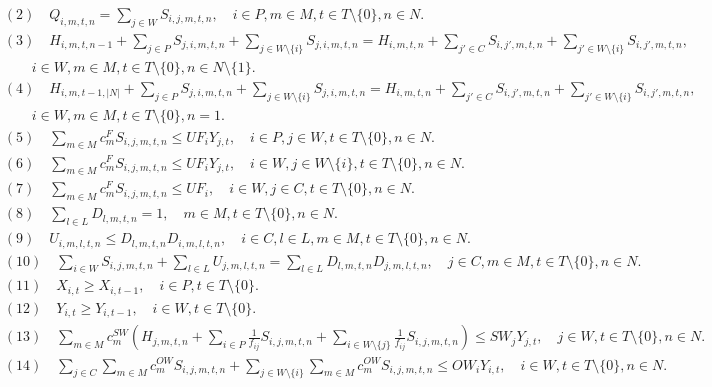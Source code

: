 \documentclass[10pt]{article}
\begin{document}
\[
\begin{aligned}
& (2) \quad Q_{i,m,t,n} = \sum_{j \in W} S_{i,j,m,t,n}, \quad i \in P, m \in M, t \in T \setminus \{0\}, n \in N. \\
& (3) \quad H_{i,m,t,n-1} + \sum_{j \in P} S_{j,i,m,t,n} + \sum_{j \in W \setminus \{i\}} S_{j,i,m,t,n} = H_{i,m,t,n} + \sum_{j' \in C} S_{i,j',m,t,n} + \sum_{j' \in W \setminus \{i\}} S_{i,j',m,t,n}, \\
& \qquad i \in W, m \in M, t \in T \setminus \{0\}, n \in N \setminus \{1\}. \\
& (4) \quad H_{i,m,t-1,|N|} + \sum_{j \in P} S_{j,i,m,t,n} + \sum_{j \in W \setminus \{i\}} S_{j,i,m,t,n} = H_{i,m,t,n} + \sum_{j' \in C} S_{i,j',m,t,n} + \sum_{j' \in W \setminus \{i\}} S_{i,j',m,t,n}, \\
& \qquad i \in W, m \in M, t \in T \setminus \{0\}, n = 1. \\
& (5) \quad \sum_{m \in M} c^F_m S_{i,j,m,t,n} \le UF_i Y_{j,t}, \quad i \in P, j \in W, t \in T \setminus \{0\}, n \in N. \\
& (6) \quad \sum_{m \in M} c^F_m S_{i,j,m,t,n} \le UF_i Y_{j,t}, \quad i \in W, j \in W \setminus \{i\}, t \in T \setminus \{0\}, n \in N. \\
& (7) \quad \sum_{m \in M} c^F_m S_{i,j,m,t,n} \le UF_i, \quad i \in W, j \in C, t \in T \setminus \{0\}, n \in N. \\
& (8) \quad \sum_{l \in L} D_{l,m,t,n} = 1, \quad m \in M, t \in T \setminus \{0\}, n \in N. \\
& (9) \quad U_{i,m,l,t,n} \le D_{l,m,t,n} D_{i,m,l,t,n}, \quad i \in C, l \in L, m \in M, t \in T \setminus \{0\}, n \in N. \\
& (10) \quad \sum_{i \in W} S_{i,j,m,t,n} + \sum_{l \in L} U_{j,m,l,t,n} = \sum_{l \in L} D_{l,m,t,n} D_{j,m,l,t,n}, \quad j \in C, m \in M, t \in T \setminus \{0\}, n \in N. \\
& (11) \quad X_{i,t} \ge X_{i,t-1}, \quad i \in P, t \in T \setminus \{0\}. \\
& (12) \quad Y_{i,t} \ge Y_{i,t-1}, \quad i \in W, t \in T \setminus \{0\}. \\
& (13) \quad \sum_{m \in M} c^{SW}_m \left( H_{j,m,t,n} + \sum_{i \in P} \frac{1}{f_{ij}} S_{i,j,m,t,n} + \sum_{i \in W \setminus \{j\}} \frac{1}{f_{ij}} S_{i,j,m,t,n} \right) \le SW_j Y_{j,t}, \quad j \in W, t \in T \setminus \{0\}, n \in N. \\
& (14) \quad \sum_{j \in C} \sum_{m \in M} c^{OW}_m S_{i,j,m,t,n} + \sum_{j \in W \setminus \{i\}} \sum_{m \in M} c^{OW}_m S_{i,j,m,t,n} \le OW_i Y_{i,t}, \quad i \in W, t \in T \setminus \{0\}, n \in N. \\

\end{aligned}\]
\end{document}
